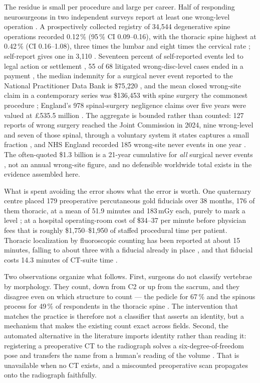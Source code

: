 \documentclass[11pt,letterpaper]{article}
\newcommand{\pc}[1]{#1\,\%}
\begin{document}
The residue is small per procedure and large per career. Half of responding neurosurgeons in two
independent surveys report at least one wrong-level operation \citep{mody2008,groff2013}. A prospectively
collected registry of 34,544 degenerative spine operations recorded \pc{0.12} (95\,\% CI 0.09--0.16), with
the thoracic spine highest at \pc{0.42} (CI 0.16--1.08), three times the lumbar and eight times the
cervical rate \citep{furuya2026}; self-report gives one in 3,110 \citep{mody2008}. Seventeen percent of
self-reported events led to legal action or settlement \citep{mody2008}, 55 of 68 litigated wrong-disc-level
cases ended in a payment \citep{goodkin2004}, the median indemnity for a surgical never event reported to
the National Practitioner Data Bank is \$75,220 \citep{bettis2026}, and the mean closed wrong-site claim in
a contemporary series was \$136,453 with spine surgery the commonest procedure \citep{tan2023}; England's
978 spinal-surgery negligence claims over five years were valued at \pounds535.5 million
\citep{machin2018}. The aggregate is bounded rather than counted: 127 reports of wrong surgery reached the
Joint Commission in 2024, nine wrong-level and seven of those spinal, through a voluntary system it states
captures a small fraction \citep{jc2024}, and NHS England recorded 185 wrong-site never events in one year
\citep{nhse2025}. The often-quoted \$1.3 billion is a 21-year cumulative for \emph{all} surgical never
events \citep{mehtsun2013}, not an annual wrong-site figure, and no defensible worldwide total exists in
the evidence assembled here.

What is spent avoiding the error shows what the error is worth. One quaternary centre placed 179
preoperative percutaneous gold fiducials over 38 months, 176 of them thoracic, at a mean of 51.9 minutes
and 183\,mGy each, purely to mark a level \citep{siminski2023}; at a hospital operating-room cost of
\$34--37 per minute before physician fees \citep{childers2018} that is roughly \$1,750--\$1,950 of staffed
procedural time per patient. Thoracic localization by fluoroscopic counting has been reported at about 15
minutes, falling to about three with a fiducial already in place \citep{mongardi2021,upadhyaya2012}, and
that fiducial costs 14.3 minutes of CT-suite time \citep{keil2024}.

Two observations organize what follows. First, surgeons do not classify vertebrae by morphology. They
count, down from C2 or up from the sacrum, and they disagree even on which structure to count --- the
pedicle for \pc{67} and the spinous process for \pc{49} of respondents in the thoracic spine
\citep{strong2021,mayer2008}. The intervention that matches the practice is therefore not a classifier that
asserts an identity, but a mechanism that makes the existing count exact across fields. Second, the
automated alternative in the literature imports identity rather than reading it: registering a preoperative
CT to the radiograph solves a six-degree-of-freedom pose and transfers the name from a human's reading of
the volume \citep{levelcheck2012,otake2015}. That is unavailable when no CT exists, and a miscounted
preoperative scan propagates onto the radiograph faithfully.
\end{document}
